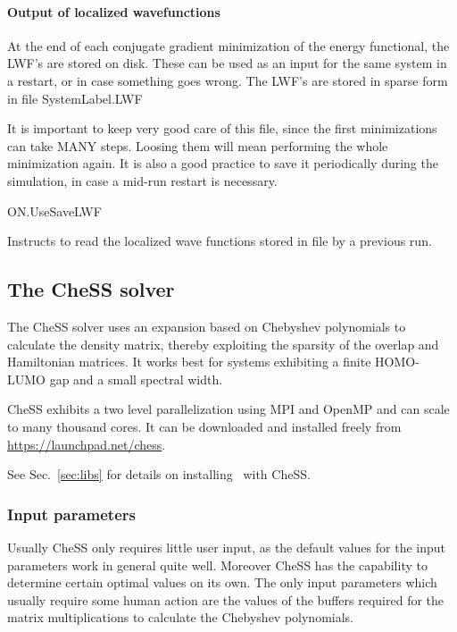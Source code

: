 \paragraph{Output of localized wavefunctions}

At the end of each conjugate gradient minimization of the energy
functional, the LWF's are stored on disk. These can be used as an
input for the same system in a restart, or in case something goes
wrong.  The LWF's are stored in sparse form in file SystemLabel.LWF

It is important to keep very good care of this file, since the first
minimizations can take MANY steps. Loosing them will mean performing
the whole minimization again. It is also a good practice to save it
periodically during the simulation, in case a mid-run restart is
necessary.

\begin{fdflogicalF}{ON.UseSaveLWF}

  Instructs to read the localized wave functions stored in file
   by a previous run.

\end{fdflogicalF}


\subsection{The CheSS solver}
\label{SolverCheSS}

The CheSS solver uses an expansion based on Chebyshev polynomials to calculate
the density matrix, thereby exploiting the sparsity of the overlap
and Hamiltonian matrices.
It works best for systems exhibiting a finite HOMO-LUMO gap and a small spectral width.

CheSS exhibits a two level parallelization using MPI and OpenMP and can scale
to many thousand cores.
It can be downloaded and installed freely from
\url{https://launchpad.net/chess}.

See Sec.~\ref{sec:libs} for details on installing \siesta\ with CheSS.

\subsubsection{Input parameters}
Usually CheSS only requires little user input, as the default values for the input parameters
work in general quite well. Moreover CheSS has the capability to determine certain optimal values
on its own. The only input parameters which usually require some human action are the values 
of the buffers required for the matrix multiplications to calculate the Chebyshev polynomials.


